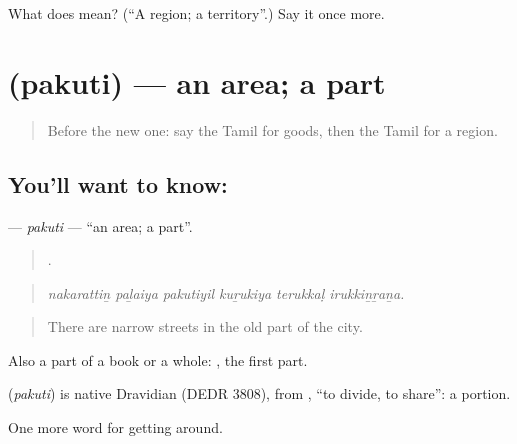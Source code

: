\begin{tcolorbox}[breakable,colback=teal!4,colframe=teal!35!black,title={Before you move on}]
What does  mean? (\textquotedblleft{}A region; a territory\textquotedblright{}.) Say it once more.
\end{tcolorbox}
\section[\texorpdfstring{\ta{பகுதி} (pakuti)}{பகுதி (pakuti)}]{ (pakuti) — an area; a part}

\label{lesson:TA-C452-pakuti}



\begin{quote}
Before the new one: say the Tamil for goods, then the Tamil for a region.
\end{quote}

\subsection*{You'll want to know: }
\textbf{} — \emph{pakuti} — \textquotedblleft{}an area; a part\textquotedblright{}.

\begin{quote}
     .
\end{quote}

\begin{quote}
\emph{nakarattiṉ paḻaiya pakutiyil kuṟukiya terukkaḷ irukkiṉṟaṉa.}
\end{quote}

\begin{quote}
There are narrow streets in the old part of the city.
\end{quote}

Also a part of a book or a whole:  , the first part.

\begin{cousinweb}
\textbf{} (\emph{pakuti}) is native Dravidian (DEDR 3808), from , \textquotedblleft{}to divide, to share\textquotedblright{}: a portion.
\end{cousinweb}

\begin{grammarlens}[title={What you've built}]
One more word for getting around.
\end{grammarlens}

